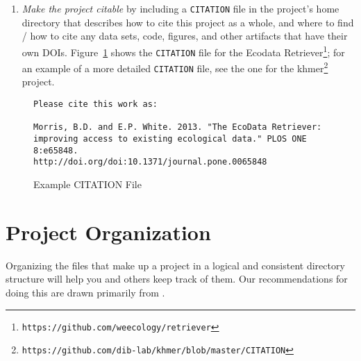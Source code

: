 \documentclass[10pt]{article}
\newcommand{\recommend}[1]{\textit{#1}}
\newcommand{\withurl}[2]{{#1}\footnote{\texttt{#2}}}
\begin{document}
\begin{enumerate}
  \begin{framed}
    \noindent \textbf{What Not To Do}

    We recommend \emph{against} the ``no commercial use'' variations
    of the Creative Commons licenses because they may impede some
    forms of re-use.  For example, if a researcher in a developing
    country is being paid by her government to compile a public health
    report, she will be unable to include your data if the license says 
    ``non-commercial''. We recommend permissive software licenses rather 
    than the \withurl{GNU General Public
      License}{https://www.safaribooksonline.com/library/view/understanding-open-source/0596005814/ch03.html}
    (GPL) because it is easier to integrate permissively-licensed
    software into other projects. 
  \end{framed}

\item
  \recommend{Make the project citable} by including a
  \texttt{CITATION} file in the project's home directory that
  describes how to cite this project as a whole, and where to find / how to cite 
  any data sets, code, figures, and other artifacts
  that have their own DOIs.  Figure~\ref{fig:citation} shows the
  \texttt{CITATION} file for the \withurl{Ecodata
    Retriever}{https://github.com/weecology/retriever}; for an example
  of a more detailed \texttt{CITATION} file, see the one for the
  \withurl{khmer}{https://github.com/dib-lab/khmer/blob/master/CITATION}
  project.

\end{enumerate}

\begin{figure}
\begin{verbatim}
Please cite this work as:

Morris, B.D. and E.P. White. 2013. "The EcoData Retriever:
improving access to existing ecological data." PLOS ONE 8:e65848.
http://doi.org/doi:10.1371/journal.pone.0065848
\end{verbatim}
\caption{Example CITATION File}
\label{fig:citation}
\end{figure}

\section{Project Organization}\label{sec:project}

Organizing the files that make up a project in a logical and
consistent directory structure will help you and others keep track of
them.  Our recommendations for doing this are drawn primarily from
\cite{noble2009,gentzkow2014}.
\end{document}
